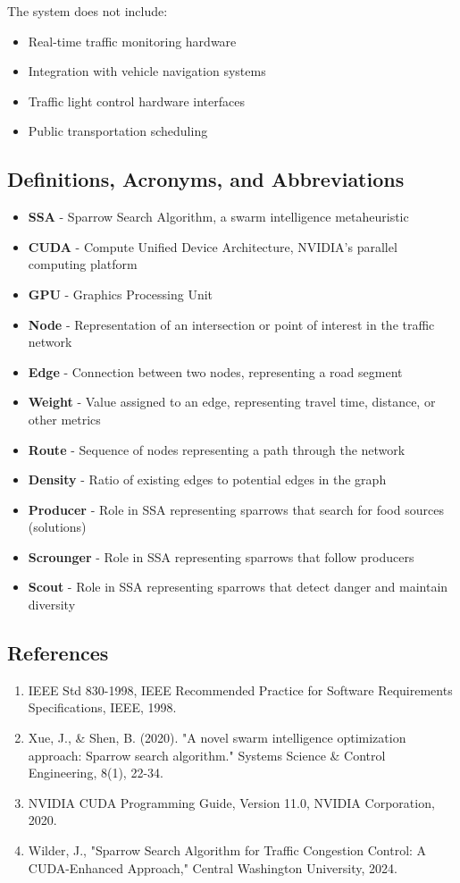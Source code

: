 \documentclass[conference]{IEEEtran}
\begin{document}
The system does not include:
\begin{itemize}
    \item Real-time traffic monitoring hardware
    \item Integration with vehicle navigation systems
    \item Traffic light control hardware interfaces
    \item Public transportation scheduling
\end{itemize}

\subsection{Definitions, Acronyms, and Abbreviations}
\begin{itemize}
    \item \textbf{SSA} - Sparrow Search Algorithm, a swarm intelligence metaheuristic
    \item \textbf{CUDA} - Compute Unified Device Architecture, NVIDIA's parallel computing platform
    \item \textbf{GPU} - Graphics Processing Unit
    \item \textbf{Node} - Representation of an intersection or point of interest in the traffic network
    \item \textbf{Edge} - Connection between two nodes, representing a road segment
    \item \textbf{Weight} - Value assigned to an edge, representing travel time, distance, or other metrics
    \item \textbf{Route} - Sequence of nodes representing a path through the network
    \item \textbf{Density} - Ratio of existing edges to potential edges in the graph
    \item \textbf{Producer} - Role in SSA representing sparrows that search for food sources (solutions)
    \item \textbf{Scrounger} - Role in SSA representing sparrows that follow producers
    \item \textbf{Scout} - Role in SSA representing sparrows that detect danger and maintain diversity
\end{itemize}

\subsection{References}
\begin{enumerate}
    \item IEEE Std 830-1998, IEEE Recommended Practice for Software Requirements Specifications, IEEE, 1998.
    \item Xue, J., \& Shen, B. (2020). "A novel swarm intelligence optimization approach: Sparrow search algorithm." Systems Science \& Control Engineering, 8(1), 22-34.
    \item NVIDIA CUDA Programming Guide, Version 11.0, NVIDIA Corporation, 2020.
    \item Wilder, J., "Sparrow Search Algorithm for Traffic Congestion Control: A CUDA-Enhanced Approach," Central Washington University, 2024.
\end{enumerate}
\end{document}
